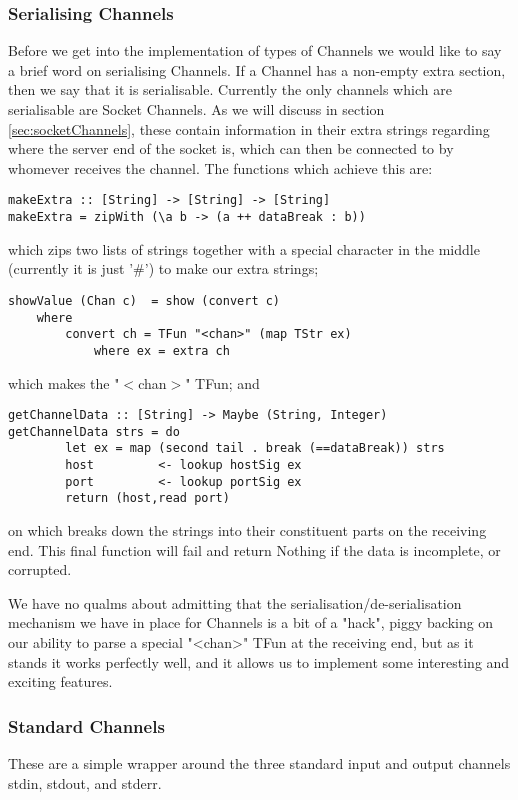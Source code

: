\subsubsection{Serialising Channels}
\label{sec:serialisingChannels}
Before we get into the implementation of types of Channels we would like to say a brief word on serialising Channels.
If a Channel has a non-empty extra section, then we say that it is serialisable. Currently the only channels which are serialisable are Socket Channels. As we will discuss in section \ref{sec:socketChannels}, these contain information in their extra strings regarding where the server end of the socket is, which can then be connected to by whomever receives the channel.
The functions which achieve this are: 

\begin{verbatim}
makeExtra :: [String] -> [String] -> [String]
makeExtra = zipWith (\a b -> (a ++ dataBreak : b))
\end{verbatim}
which zips two lists of strings together with a special character in the middle (currently it is just '\#') to make our extra strings; 
\begin{verbatim}
showValue (Chan c)  = show (convert c)
    where 
        convert ch = TFun "<chan>" (map TStr ex) 
            where ex = extra ch
\end{verbatim}
which makes the "$<$chan$>$" TFun;
and 
\begin{verbatim}
getChannelData :: [String] -> Maybe (String, Integer)
getChannelData strs = do
        let ex = map (second tail . break (==dataBreak)) strs
        host         <- lookup hostSig ex
        port         <- lookup portSig ex
        return (host,read port)
\end{verbatim}
on which breaks down the strings into their constituent parts on the receiving end. This final function will fail and return Nothing if the data is incomplete, or corrupted.

We have no qualms about admitting that the serialisation/de-serialisation mechanism we have in place for Channels is a bit of a "hack", piggy backing on our ability to parse a special "<chan>" TFun at the receiving end, but as it stands it works perfectly well, and it allows us to implement some interesting and exciting features.

\subsubsection{Standard Channels}
These are a simple wrapper around the three standard input and output channels stdin, stdout, and stderr.

